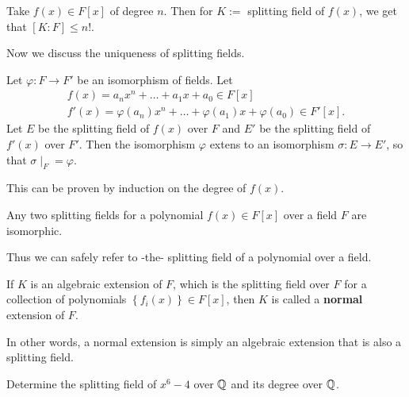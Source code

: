 \documentclass{memoir}
\begin{document}


\begin{prop}
	Take \(f(x) \in F[x]\) of degree \(n\). Then for \(K :=\) splitting field of \(f(x)\), we get that \([K:F] \leq n!\).
\end{prop}
Now we discuss the uniqueness of splitting fields.
\begin{thm}
	Let \(\varphi :F\to F'\) be an isomorphism of fields. Let
	\begin{align*}
		f(x) = a_nx^{n}+ \ldots + a_1x + a_0 \in F[x]\\
		f'(x) = \varphi (a_n)x^{n}+ \ldots + \varphi (a_1) x + \varphi (a_0) \in F'[x].
	\end{align*}
	Let \(E\) be the splitting field of \(f(x)\) over \(F\) and \(E'\) be the splitting field of \(f'(x)\) over \(F'\). Then the isomorphism \(\varphi \) extens to an isomorphism \(\sigma :E\to E'\), so that \(\sigma \mid_F = \varphi \).
\end{thm}
This can be proven by induction on the degree of \(f(x)\).
\begin{cor}
	Any two splitting fields for a polynomial \(f(x) \in F[x]\) over a field \(F\) are isomorphic.
\end{cor}

Thus we can safely refer to -the- splitting field of a polynomial over a field.

\begin{defn}
	If \(K\) is an algebraic extension of \(F\), which is the splitting field over \(F\) for a collection of polynomials \(\left\{ f_i(x) \right\} \in F[x]\), then \(K\) is called a \textbf{normal} extension of \(F\).
\end{defn}
In other words, a normal extension is simply an algebraic extension that is also a splitting field.
\begin{hw}
	Determine the splitting field of \(x^{6}-4\) over \(\mathbb{Q}\) and its degree over \(\mathbb{Q}\).
\end{hw}
\end{document}
